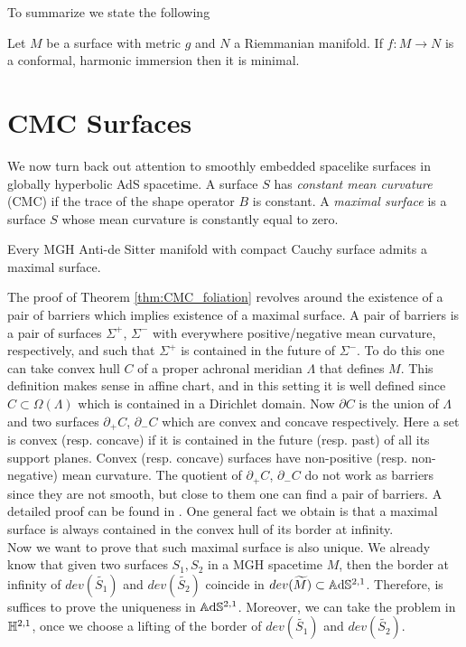 To summarize we state the following
\begin{theorem}\label{thm:minimal}
    Let $M$ be a surface with metric $g$ and $N$ a Riemmanian manifold. If $f: M \to N$ is a conformal, harmonic immersion then it is minimal.
\end{theorem}

\section{CMC Surfaces}
We now turn back out attention to smoothly embedded spacelike surfaces in globally hyperbolic AdS spacetime. A surface $S$ has \textit{constant mean curvature} (CMC) if the trace of the shape operator $B$ is constant. A \textit{maximal surface} is a surface $S$ whose mean curvature is constantly equal to zero.
\begin{theorem}\label{thm:CMC_foliation}
    Every MGH Anti-de Sitter manifold with compact Cauchy surface admits a maximal surface.
\end{theorem}
The proof of Theorem \ref{thm:CMC_foliation} revolves around the existence of a pair of barriers which implies existence of a maximal surface. A pair of barriers is a pair of surfaces $\Sigma^+$, $\Sigma^-$ with everywhere positive/negative mean curvature, respectively, and such that $\Sigma^+$ is contained in the future of $\Sigma^-$.
To do this one can take convex hull $C$ of a proper achronal meridian $\Lambda$ that defines $M$. This definition makes sense in affine chart, and in this setting it is well defined since $C \subset \Omega(\Lambda)$ which is contained in a Dirichlet domain. Now $\partial C$ is the union of $\Lambda$ and two surfaces $\partial_+ C$, $\partial_- C$ which are convex and concave respectively. Here a set is convex (resp. concave) if it is contained in the future (resp. past) of all its support planes. Convex (resp. concave) surfaces have non-positive (resp. non-negative) mean curvature. The quotient of $\partial_+ C$, $\partial_- C$ do not work as barriers since they are not smooth, but close to them one can find a pair of barriers.
A detailed proof can be found in \cite{barbot2004constant}. One general fact we obtain is that a maximal surface is always contained in the convex hull of its border at infinity.\\
Now we want to prove that such maximal surface is also unique. We already know that given two surfaces $S_1, S_2$ in a MGH spacetime $M$, then the border at infinity of $dev(\widetilde{S_1})$ and $dev(\widetilde{S_2})$ coincide in $dev(\widetilde{M})\subset \mathbb{A}\mathrm{d}\mathbb{S}^{2,1}$. Therefore, is suffices to prove the uniqueness in $\mathbb{A}\mathrm{d}\mathbb{S}^{2,1}$. Moreover, we can take the problem in $\mathbb{H}^{2,1}$, once we choose a lifting of the border of $dev(\widetilde{S_1})$ and $dev(\widetilde{S_2})$.\\
